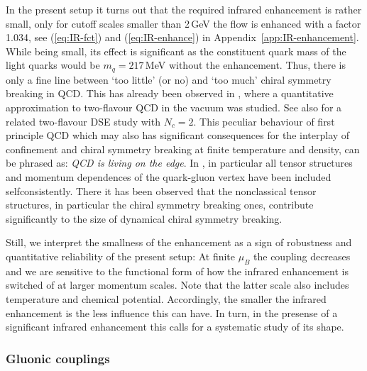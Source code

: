 \documentclass[%
reprint,
superscriptaddress,
showpacs,preprintnumbers,
 amsmath,amssymb,
 aps,
prd,
]{revtex4-1}
\def\eq#1{(\ref{#1})}
\def\app#1{Appendix~\ref{#1}}
\begin{document}
In the present setup it turns out that the required infrared
enhancement is rather small, only for cutoff scales smaller than
2\,GeV the flow is enhanced with a factor 1.034, see \eq{eq:IR-fct}
and \eq{eq:IR-enhance} in \app{app:IR-enhancement}.  While being
small, its effect is significant as the constituent quark mass of the
light quarks would be $m_q \!=\! 217$\,MeV without the
enhancement. Thus, there is only a fine line between `too little' (or
no) and `too much' chiral symmetry breaking in QCD. This has already
been observed in \cite{Mitter:2014wpa,Cyrol:2017ewj}, where a
quantitative approximation to two-flavour QCD in the vacuum was
studied. See also \cite{Vujinovic:2018nko} for a related two-flavour
DSE study with $N_c=2$. This peculiar behaviour of first principle QCD
which may also has significant consequences for the interplay of
confinement and chiral symmetry breaking at finite temperature and
density, can be phrased as: \textit{QCD is living on the edge}. In
\cite{Mitter:2014wpa,Cyrol:2017ewj}, in particular all tensor
structures and momentum dependences of the quark-gluon vertex have
been included selfconsistently. There it has been observed that the
nonclassical tensor structures, in particular the chiral symmetry
breaking ones, contribute significantly to the size of dynamical
chiral symmetry breaking.

Still, we interpret the smallness of the enhancement as a sign of
robustness and quantitative reliability of the present setup: At
finite $\mu_B$ the coupling decreases and we are sensitive to the
functional form of how the infrared enhancement is switched of at
larger momentum scales. Note that the latter scale also includes
temperature and chemical potential. Accordingly, the smaller the
infrared enhancement is the less influence this can have. In turn, in
the presense of a significant infrared enhancement this calls for a
systematic study of its shape.

\subsubsection{Gluonic couplings}
\label{sec:gluoniccouplings}
\end{document}
